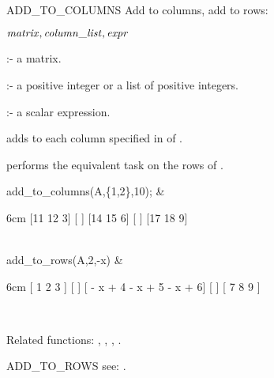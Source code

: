 \begin{Operator}[addtocolumns]{ADD_TO_COLUMNS}
Add to columns, add to rows:

\begin{Syntax}
\(\meta{matrix},\meta{column\_list},\meta{expr}\)
\end{Syntax}

       :- a matrix. 

 :- a positive integer or a list of positive 
                       integers. 

         :- a scalar expression.

 adds  to each column specified in 
 of .  

 performs the equivalent task on the rows of 
.

\begin{Examples}

add_to_columns(A,\{1,2\},10); &
\begin{multilineoutput}{6cm}
[11  12  3]
[         ]
[14  15  6]
[         ]
[17  18  9]
\end{multilineoutput}\\

add_to_rows(A,2,-x) &
\begin{multilineoutput}{6cm} 
[   1         2         3    ]
[                            ]
[ - x + 4   - x + 5   - x + 6]
[                            ]
[   7         8         9    ]
\end{multilineoutput} \\
\end{Examples}

Related functions:
,  ,  , 
.

\end{Operator}


\begin{Operator}[addtorows]{ADD_TO_ROWS}
 see:  .
\end{Operator}


